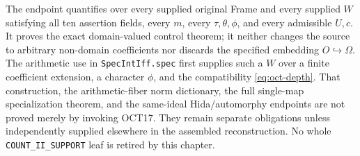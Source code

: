 The endpoint quantifies over every supplied original Frame
and every supplied $W$ satisfying all ten assertion
fields, every $m$, every $\tau,\theta,\phi$, and every
admissible $U,c$.  It proves the exact domain-valued control
theorem; it neither changes the source to arbitrary
non-domain coefficients nor discards the specified embedding
$O\hookrightarrow\Omega$.  The arithmetic use in
\texttt{SpecIntIff.spec} first supplies such a $W$ over a
finite coefficient extension, a character $\phi$, and the
compatibility \eqref{eq:oct-depth}.  That construction,
the arithmetic-fiber norm dictionary, the full single-map
specialization theorem, and the same-ideal Hida/automorphy
endpoints are not proved merely by invoking OCT17.  They
remain separate obligations unless independently supplied
elsewhere in the assembled reconstruction.  No whole
\texttt{COUNT\_II\_SUPPORT} leaf is retired by this chapter.
